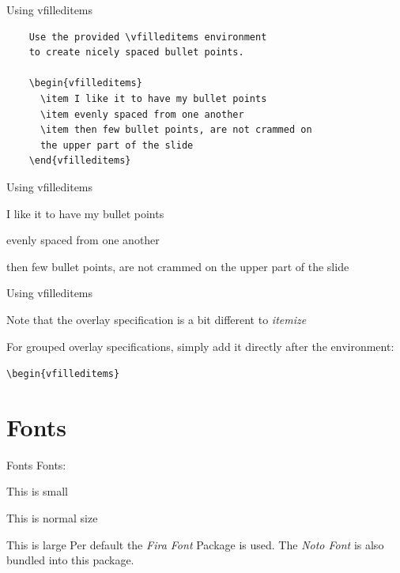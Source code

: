 \documentclass[aspectratio=169]{beamer}
\begin{document}
\begin{frame}[fragile]{Using vfilleditems}
	\begin{verbatim}
    Use the provided \vfilleditems environment
    to create nicely spaced bullet points.

    \begin{vfilleditems}
      \item I like it to have my bullet points
      \item evenly spaced from one another
      \item then few bullet points, are not crammed on
      the upper part of the slide
    \end{vfilleditems}
    \end{verbatim}
\end{frame}

\begin{frame}{Using vfilleditems}
	\begin{vfilleditems}
		\item I like it to have my bullet points
		\item evenly spaced from one another
		\item then few bullet points, are not crammed on
		the upper part of the slide
	\end{vfilleditems}
\end{frame}

\begin{frame}{Using vfilleditems}
	\begin{vfilleditems}
		\item Note that the overlay specification
		is a bit different to \emph{itemize}
		\item For grouped overlay specifications, simply add it
		directly after the environment:
		\begin{vfilleditems}
			\item \texttt{\textbackslash{}begin\{vfilleditems\}<+->}
		\end{vfilleditems}
	\end{vfilleditems}
\end{frame}


\section{Fonts}
\begin{frame}[fragile]{Fonts}
	Fonts:

	{\small This is small}

	This is normal size

		{\large This is large}
	\vfill
	Per default the \emph{Fira Font} Package is
	used. The \emph{Noto Font} is also bundled into this
	package.
\end{frame}
\end{document}
